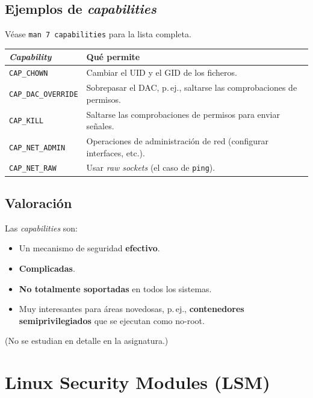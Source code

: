 \documentclass[11pt,a4paper]{report}
\begin{document}
\section{Ejemplos de \emph{capabilities}}
 
Véase \texttt{man 7 capabilities} para la lista completa.
 
\begin{center}
\small
{\setlength{\aboverulesep}{0pt}\setlength{\belowrulesep}{0pt}\renewcommand{\arraystretch}{1.3}%
\begin{tabularx}{\linewidth}{>{\raggedright\arraybackslash}p{4.2cm} !{\color{gray!45}\vrule width 0.2pt} >{\raggedright\arraybackslash}X}
\toprule
\textbf{\emph{Capability}} & \textbf{Qué permite} \\
\midrule
\texttt{CAP\_CHOWN} & Cambiar el UID y el GID de los ficheros. \\
\texttt{CAP\_DAC\_OVERRIDE} & Sobrepasar el DAC, p.\,ej., saltarse las comprobaciones de permisos. \\
\texttt{CAP\_KILL} & Saltarse las comprobaciones de permisos para enviar señales. \\
\texttt{CAP\_NET\_ADMIN} & Operaciones de administración de red (configurar interfaces, etc.). \\
\texttt{CAP\_NET\_RAW} & Usar \emph{raw sockets} (el caso de \texttt{ping}). \\
\bottomrule
\end{tabularx}}
\end{center}
 
\section{Valoración}
 
Las \emph{capabilities} son:
\begin{itemize}
  \item Un mecanismo de seguridad \textbf{efectivo}.
  \item \textbf{Complicadas}.
  \item \textbf{No totalmente soportadas} en todos los sistemas.
  \item Muy interesantes para áreas novedosas, p.\,ej., \textbf{contenedores semiprivilegiados} que se ejecutan como no-root.
\end{itemize}
(No se estudian en detalle en la asignatura.)
 
\chapter{Linux Security Modules (LSM)}
 
\end{document}
